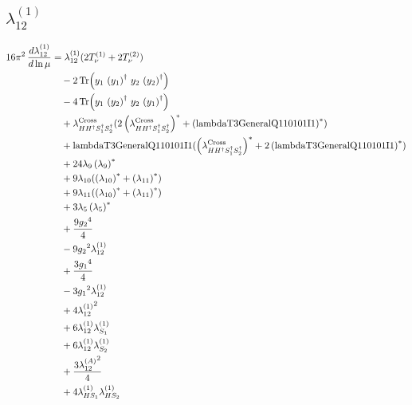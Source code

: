 \documentclass[10pt,a4paper]{article}
\begin{document}
\subsection*{$\lambda_{12}^{(1)}$}
\begin{align*}
16\pi^2\,\frac{d \lambda_{12}^{(1)}}{d\ln\mu} &={\lambda_{12}^{(1)}} (2 T_{\nu}^{(1)}+2 T_{\nu}^{(2)}) \\
&\quad -2 \operatorname{Tr}\!\left({y_1}\,\left({y_1}\right)^{\dagger}\,{y_2}\,\left({y_2}\right)^{\dagger}\right) \\
&\quad -4 \operatorname{Tr}\!\left({y_1}\,\left({y_2}\right)^{\dagger}\,{y_2}\,\left({y_1}\right)^{\dagger}\right) \\
&\quad +{\lambda_{H H^\dagger S_1^\dagger S_2^\dagger}^{\rm Cross}} (2 \left({\lambda_{H H^\dagger S_1^\dagger S_2^\dagger}^{\rm Cross}}\right)^{*}+\left(\text{lambdaT3GeneralQ110101I1}\right)^{*}) \\
&\quad +\text{lambdaT3GeneralQ110101I1} (\left({\lambda_{H H^\dagger S_1^\dagger S_2^\dagger}^{\rm Cross}}\right)^{*}+2 \left(\text{lambdaT3GeneralQ110101I1}\right)^{*}) \\
&\quad +24 {\lambda_{9}} \left({\lambda_{9}}\right)^{*} \\
&\quad +9 {\lambda_{10}} (\left({\lambda_{10}}\right)^{*}+\left({\lambda_{11}}\right)^{*}) \\
&\quad +9 {\lambda_{11}} (\left({\lambda_{10}}\right)^{*}+\left({\lambda_{11}}\right)^{*}) \\
&\quad +3 {\lambda_5} \left({\lambda_5}\right)^{*} \\
&\quad +\frac{9 {g_2}^4}{4} \\
&\quad -9 {g_2}^2 {\lambda_{12}^{(1)}} \\
&\quad +\frac{3 {g_1}^4}{4} \\
&\quad -3 {g_1}^2 {\lambda_{12}^{(1)}} \\
&\quad +4 {\lambda_{12}^{(1)}}^2 \\
&\quad +6 {\lambda_{12}^{(1)}} {\lambda_{S_1}^{(1)}} \\
&\quad +6 {\lambda_{12}^{(1)}} {\lambda_{S_2}^{(1)}} \\
&\quad +\frac{3 {\lambda_{12}^{(A)}}^2}{4} \\
&\quad +4 {\lambda_{HS_1}^{(1)}} {\lambda_{HS_2}^{(1)}} \\
\end{align*}
\end{document}

